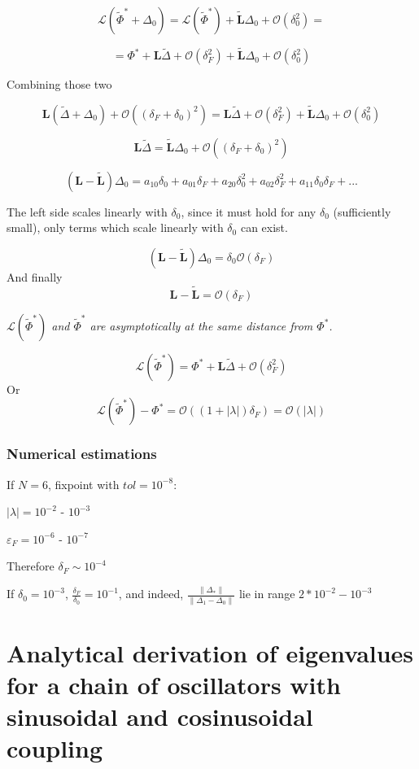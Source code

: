 \documentclass[a4paper,10pt]{article}
\newcommand*{\wt}{\widetilde} %
\newcommand*{\bigO}{\mathcal{O}}
\newcommand*{\FP}{\Phi^*}%
\newcommand*{\D}{\Delta}%
\newcommand*{\Lmap}{\mathcal{L}} %
\newcommand*{\Lmat}{\mathbf{L}}  %
\begin{document}
\begin{appendices}
$$
\mathcal{L}(\wt \FP + \D_0)
= \mathcal{L}(\wt \FP) +  \wt{\mathbf{L}} \D_0 + \mathcal{O}(\delta_0^2) =
$$

$$
=  \FP + \Lmat \wt \D + \mathcal{O}(\delta_F^2)  +  \wt{\mathbf{L}} \D_0 + \mathcal{O}(\delta_0^2)
$$%


Combining those two

$$
\mathbf{L}  ( \wt \D +  \D_0 ) + \mathcal{O}(( \delta_F + \delta_0)^2)
=
\Lmat \wt \D + \mathcal{O}(\delta_F^2)  +  \wt{\mathbf{L}} \D_0 + \mathcal{O}(\delta_0^2)
$$


$$
\mathbf{L} \wt \D 
=
 \wt{\mathbf{L}} \D_0 + \mathcal{O}(( \delta_F + \delta_0)^2)
$$

$$
(\mathbf{L} -  \wt{\mathbf{L}}) \D_0 
=
a_{10} \delta_0 + a_{01} \delta_F + a_{20}  \delta_0^2 + a_{02} \delta_F^2 + a_{11} \delta_0 \delta_F + ...
$$

The left side scales linearly with $\delta_0$, since it must hold for any $\delta_0$ (sufficiently small), only terms which scale linearly with $\delta_0$ can exist.

$$
(\mathbf{L} -  \wt{\mathbf{L}}) \D_0 
=
\delta_0 \bigO(\delta_F)
$$
And finally
$$
\mathbf{L} -  \wt{\mathbf{L}}
=
 \mathcal{O}(\delta_F)
$$

\textit{$\Lmap(\wt \FP)$ and $\wt \FP$ are asymptotically at the same distance from $\FP$.}

\begin{equation}
\Lmap(\wt \FP) = \FP + \Lmat \wt \D + \mathcal{O}(\delta_F ^2)
\end{equation}
Or
\begin{equation}
\Lmap(\wt \FP) - \FP = \bigO((1 + |\lambda|) \delta_F) = \bigO(|\lambda|)
\end{equation}
\subsubsection{Numerical estimations}

If $N = 6$, fixpoint with $ tol  =10 ^{-8}$:

$|\lambda| = 10 ^ {-2}$ - $10 ^ {-3}$

$\varepsilon_F = 10 ^ {-6}$ - $10^{-7}$

Therefore $\delta_F \sim 10 ^{ -4}$

If $\delta_0 = 10 ^{-3}$, $\frac{ \delta_F } {  \delta_0 } = 10^{-1}$, and indeed,
$ \frac{ \lVert \D_* \rVert }  {\lVert \D_1 - \D_0 \rVert }$ lie in range $2 * 10^{-2} - 10 ^{-3} $



\section{Analytical derivation of eigenvalues for a chain of oscillators with sinusoidal and cosinusoidal coupling} 
 

\end{appendices}


\clearpage


\end{document}
